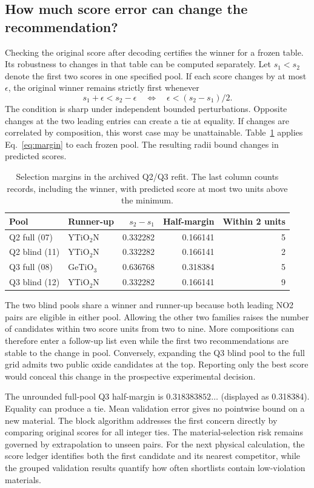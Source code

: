 \subsection{How much score error can change the recommendation?}
Checking the original score after decoding certifies the winner for a frozen table. Its robustness to changes in that table can be computed separately. Let $s_1<s_2$ denote the first two scores in one specified pool. If each score changes by at most $\epsilon$, the original winner remains strictly first whenever
\begin{equation}
 s_1+\epsilon<s_2-\epsilon
 \quad\Longleftrightarrow\quad \epsilon<(s_2-s_1)/2 .
 \label{eq:margin}
\end{equation}
The condition is sharp under independent bounded perturbations. Opposite changes at the two leading entries can create a tie at equality. If changes are correlated by composition, this worst case may be unattainable. Table~\ref{tab:margins} applies Eq.~\eqref{eq:margin} to each frozen pool. The resulting radii bound changes in predicted scores.

\begin{table}[htbp]
\caption{Selection margins in the archived Q2/Q3 refit. The last column counts records, including the winner, with predicted score at most two units above the minimum.}\label{tab:margins}
\centering\small\begin{tabular}{llrrr}
\toprule Pool & Runner-up & $s_2-s_1$ & Half-margin & Within 2 units\\\midrule
Q2 full (07) & $\mathrm{YTiO_2N}$ & 0.332282 & 0.166141 & 5\\
Q2 blind (11) & $\mathrm{YTiO_2N}$ & 0.332282 & 0.166141 & 2\\
Q3 full (08) & $\mathrm{GeTiO_3}$ & 0.636768 & 0.318384 & 5\\
Q3 blind (12) & $\mathrm{YTiO_2N}$ & 0.332282 & 0.166141 & 9\\\bottomrule
\end{tabular}
\end{table}

The two blind pools share a winner and runner-up because both leading NO2 pairs are eligible in either pool. Allowing the other two families raises the number of candidates within two score units from two to nine. More compositions can therefore enter a follow-up list even while the first two recommendations are stable to the change in pool. Conversely, expanding the Q3 blind pool to the full grid admits two public oxide candidates at the top. Reporting only the best score would conceal this change in the prospective experimental decision.

The unrounded full-pool Q3 half-margin is $0.318383852\ldots$ (displayed as 0.318384). Equality can produce a tie. Mean validation error gives no pointwise bound on a new material. The block algorithm addresses the first concern directly by comparing original scores for all integer ties. The material-selection risk remains governed by extrapolation to unseen pairs. For the next physical calculation, the score ledger identifies both the first candidate and its nearest competitor, while the grouped validation results quantify how often shortlists contain low-violation materials.
